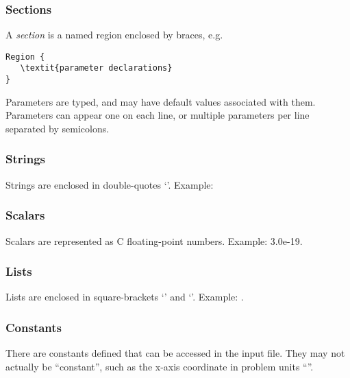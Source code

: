 \subsubsection{Sections}

A \textit{section} is a named region enclosed by braces, e.g.

\begin{verbatim}
Region { 
   \textit{parameter declarations} 
}
\end{verbatim}


Parameters are typed, and may have default values associated with
them.  Parameters can appear one on each line, or multiple parameters
per line separated by semicolons.

\subsubsection{Strings}

Strings are enclosed in double-quotes `'.  Example: 

\subsubsection{Scalars}

Scalars are represented as C floating-point numbers.  Example: 3.0e-19.

\subsubsection{Lists} 

Lists are enclosed in square-brackets `\code{$[$}' and `\code{$]$}'.  Example: \code{$[$3e9,3e9,3e9$]$}.

\subsubsection{Constants} 

There are constants defined that can be accessed in the input file.  They
may not actually be ``constant'', such as the x-axis coordinate
in problem units ``''.

